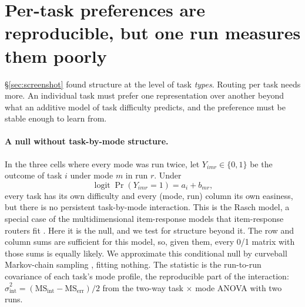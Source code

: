 \section{Per-task preferences are reproducible, but one run measures them poorly}\label{sec:preference}

\S\ref{sec:screenshot} found structure at the level of task \emph{types}. Routing per task needs more. An individual task must prefer one representation over another beyond what an additive model of task difficulty predicts, and the preference must be stable enough to learn from.

\paragraph{A null without task-by-mode structure.} In the three cells where every mode was run twice, let $Y_{imr}\in\{0,1\}$ be the outcome of task $i$ under mode $m$ in run $r$. Under
\[
  \operatorname{logit}\Pr(Y_{imr}=1) = a_i + b_{mr},
\]
every task has its own difficulty and every (mode, run) column its own easiness, but there is no persistent task-by-mode interaction. This is the Rasch model, a special case of the multidimensional item-response models that item-response routers fit \citep{song2025irtrouter}. Here it is the null, and we test for structure beyond it. The row and column sums are sufficient for this model, so, given them, every 0/1 matrix with those sums is equally likely. We approximate this conditional null by curveball Markov-chain sampling \citep{strona2014curveball}, fitting nothing. The statistic is the run-to-run covariance of each task's mode profile, the reproducible part of the interaction: $\hat\sigma^2_{\text{int}} = (\mathrm{MS}_{\text{int}} - \mathrm{MS}_{\text{err}})/2$ from the two-way task $\times$ mode ANOVA with two runs.

